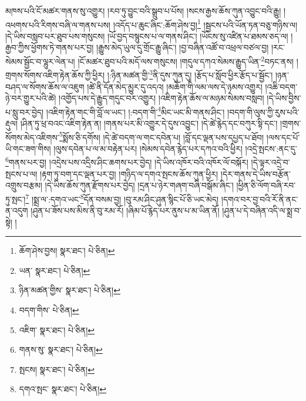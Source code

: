 མཁས་པའི་ངོ་མཚར་གནས་སུ་འགྱུར། །རབ་ཏུ་བྱུང་བའི་སྒྲུབ་པ་པོས། །སངས་རྒྱས་ཆོས་ཀུན་འབྱུང་བའི་རྒྱུ། །འཕགས་པའི་རིགས་བཞི་ལ་གནས་པས། །འདོད་པ་ཆུང་ཞིང་:ཆོག་ཤེས་བྱ།\footnote{ཆོག་ཤེས་བྱས།  སྣར་ཐང་།  པེ་ཅིན། } །སྦྱངས་པའི་ཡོན་ཏན་བཅུ་གཉིས་ལ། །དེ་ཡིས་བསླབ་པར་ཐུབ་པས་གསུངས། །ཡོ་བྱད་བསྙུངས་པ་ལ་གནས་ཤིང་། །ཡོངས་སུ་འཛིན་པ་ཐམས་ཅད་ལ། །རྒྱབ་ཀྱིས་ཕྱོགས་ཏེ་གནས་པར་བྱ། །རྒྱུས་མེད་ཡུལ་དུ་གྲོང་རྒྱུ་ཞིང་། །བྱ་བཞིན་འཚོ་བ་འཕྲལ་བཙལ་བྱ། །རང་སེམས་སྦྱོང་བ་ལྷུར་ལེན་པ། །ངོ་མཚར་ཐུབ་པའི་མདོ་ལས་གསུངས། །གདུལ་དཀའ་སེམས་རྒྱུད་ཡིན་\footnote{ཡན་  སྣར་ཐང་།  པེ་ཅིན། }བཏང་ནས། །གྲགས་སོགས་འཇིག་རྟེན་ཆོས་ཀྱི་ཕྱིར། །:ཉིན་མཚན་གྱི་\footnote{ཉིན་མཚན་གྱིས་  སྣར་ཐང་།  པེ་ཅིན། }ནི་དུས་ཀུན་དུ། །རྩོད་པ་སློབ་ཕྱིར་རྩོད་པ་སྦྱོང་། །ཉན་བཤད་ལ་སོགས་ཆོས་ལ་འཇུག །ཚེ་ནི་དོན་མེད་མྱུར་དུ་འདའ། །མཆོག་གི་ལམ་ལས་དེ་ཉམས་འགྱུར། །འཆི་བདག་ཉེ་བར་གྱུར་པའི་ཚེ། །འགྱོད་པས་དེ་རྒྱུད་གདུང་བར་འགྱུར། །འཇིག་རྟེན་ཆོས་ལ་མཉམ་སེམས་བསླབ། །དེ་ཡིས་བྱིས་པ་སླུ་བར་བྱེད། །འཇིག་རྟེན་གང་གི་བློ་ལ་ཡང་། །:བདག་གི་\footnote{བདག་གིས་  པེ་ཅིན། }མིང་ཡང་མི་གནས་ཤིང་། །བདག་གི་ལུས་ཀྱི་རུས་པའི་རྡུལ། །ཤིན་ཏུ་ཕྲ་བའང་འཇིག་རྟེན་ན། །གནས་པར་མི་འགྱུར་དེ་དུས་འབྱུང་། །དེ་ཚེ་རྙེད་དང་བཀུར་སྟི་དང་། །གྲགས་སོགས་མེད་འཇིགས་\footnote{འཇིག་  སྣར་ཐང་།  པེ་ཅིན། }སྨོས་ཅི་དགོས། །དེ་ཚེ་བདག་ལ་གང་དབེན་པ། །བློ་དང་ལྡན་པས་དཔྱད་པ་ཐོབ། །ལས་དང་པོ་ཡི་གང་ཟག་གིས། །ལུས་དབེན་པ་ལ་མ་བརྟེན་པར། །སེམས་དབེན་རྙེད་པར་དཀའ་བའི་ཕྱིར། །འདྲེ་སྤངས་:ནང་དུ་\footnote{གནས་སུ་  སྣར་ཐང་།  པེ་ཅིན། }གནས་པར་བྱ། །འདྲེས་པས་འདྲིས་ཤིང་ཆགས་པར་བྱེད། །དེ་ཡིས་འཁོར་བའི་འཁོར་ལོ་བསྐོར། །དེ་ལྟར་འདྲེ་བ་སྤངས་པ་ལ། །རྟག་ཏུ་བག་དང་ལྡན་པར་བྱ། །གཉིད་ལ་དགའ་སྤངས་ཆོས་ཀུན་ཕྱིར། །དེར་གནས་དེ་ཡིས་བརྩོན་འགྲུས་བརྩམ། །དེ་ཡིས་ཆོས་ཀུན་རྫོགས་པར་བྱེད། །དྲན་པ་ཉེར་གཞག་བཞི་བསྒོམ་ཞིང་། །ཕྱིན་ཅི་ལོག་བཞི་རབ་ཏུ་སྤང་།\footnote{སྤངས།  སྣར་ཐང་།  པེ་ཅིན། } །སྨྲ་ལ་:དགའ་ཡང་\footnote{དགའ་སྤང་  སྣར་ཐང་།  པེ་ཅིན། }དོན་བསམ་བྱ། །བུ་རམ་ཤིང་ཤུན་སྙིང་པོ་ཅི་ཡང་མེད། །དགའ་བར་བྱ་བའི་རོ་ནི་ནང་ན་འདུག །ཤུན་པ་ཟོས་པས་མིས་ནི་བུ་རམ་རོ། །ཞིམ་པོ་རྙེད་པར་ནུས་པ་མ་ཡིན་ནོ། །ཤུན་པ་དེ་བཞིན་འདི་ལ་སྨྲ་བ་སྟེ། །

